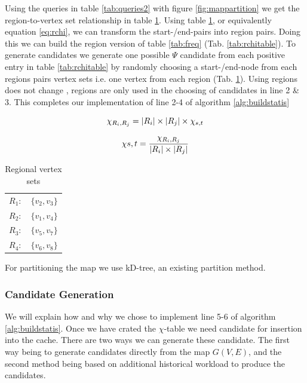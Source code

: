Using the queries in table \ref{tab:queries2} with figure \ref{fig:mappartition} we get the region-to-vertex set relationship in table \ref{tab:vperregion}. Using table \ref{tab:vperregion}, or equivalently equation \ref{eq:rchi}, we can transform the start-/end-pairs into region pairs. Doing this we can build the region version of table \ref{tab:freq} (Tab. \ref{tab:rchitable}). To generate candidates we generate one possible $\Psi$ candidate from each positive entry in table \ref{tab:rchitable} by randomly choosing a start-/end-node from each regions pairs vertex sets i.e. one vertex from each region (Tab. \ref{tab:vperregion}).
Using regions does not change \salgons, regions are only used in the choosing of candidates in line 2 \& 3.
This completes our implementation of line 2-4 of algorithm \ref{alg:buildstatis}


\begin{equation} \label{eq:rchi}
\chi{\tiny _{R_i,R_j}} = | R_i| \times |R_j| \times \chi_{s,t}
\end{equation}

\begin{equation} \label{eq:chi}
\chi{s,t} = \frac{\chi{\tiny _{R_i,R_j}}}{| R_i| \times |R_j|}
\end{equation}



\begin{table}
\center
\begin{tabular}{ll}
$R_1 :$ 	& $\{v_2,v_3\}$\\
$R_2 :$ 	& $\{v_1,v_4\}$ \\
$R_3 :$ 	& $\{v_5,v_7\}$ \\
$R_4 :$ 	& $\{v_6,v_8\}$ \\
\end{tabular}
\caption{Regional vertex sets}
\label{tab:vperregion}
\end{table}

For partitioning the map we use kD-tree, an existing partition method.



\subsubsection{Candidate Generation}

We will explain how and why we chose to implement line 5-6 of algorithm \ref{alg:buildstatis}. Once we have crated the $\chi$-table we need candidate \spaths for insertion into the cache. There are two ways we can generate these candidate. The first way being to generate candidates directly from the map $G(V,E)$, and the second method being based on additional historical workload to produce the candidates.

